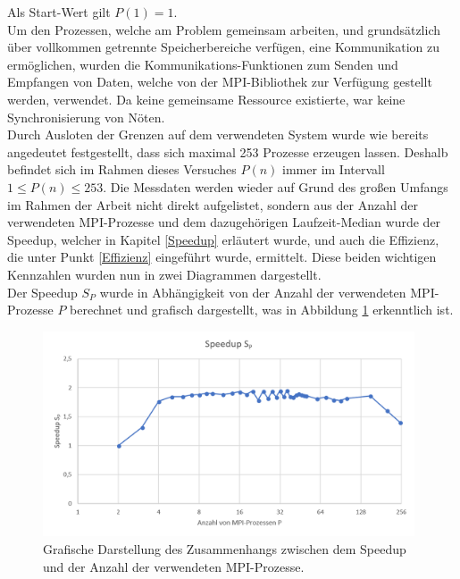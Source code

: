 \begin{description}
						Als Start-Wert gilt $P(1) = 1$.\\
						Um den Prozessen, welche am Problem gemeinsam arbeiten, und grundsätzlich über vollkommen getrennte Speicherbereiche verfügen, eine Kommunikation zu ermöglichen, wurden die Kommunikations-Funktionen zum Senden und Empfangen von Daten, welche von der MPI-Bibliothek zur Verfügung gestellt werden, verwendet. Da keine gemeinsame Ressource existierte, war keine Synchronisierung von Nöten.\\
						Durch Ausloten der Grenzen auf dem verwendeten System wurde wie bereits angedeutet festgestellt, dass sich maximal 253 Prozesse erzeugen lassen. Deshalb befindet sich im Rahmen dieses Versuches $P(n)$ immer im Intervall $1 \leq P(n) \leq 253$.
						Die Messdaten werden wieder auf Grund des großen Umfangs im Rahmen der Arbeit nicht direkt aufgelistet, sondern aus der Anzahl der verwendeten MPI-Prozesse und dem dazugehörigen Laufzeit-Median wurde der Speedup, welcher in Kapitel \ref{Speedup} erläutert wurde, und auch die Effizienz, die unter Punkt \ref{Effizienz} eingeführt wurde, ermittelt. Diese beiden wichtigen Kennzahlen wurden nun in zwei Diagrammen dargestellt.\\
						Der Speedup $S_P$ wurde in Abhängigkeit von der Anzahl der verwendeten MPI-Prozesse $P$ berechnet und grafisch dargestellt, was in Abbildung \ref{fig:Speedup_MPI} erkenntlich ist.
						
						\begin{figure}
							\centering	
							\includegraphics[width=11cm]{Abbildungen/Speedup_MPI.png}
							\caption{Grafische Darstellung des Zusammenhangs zwischen dem Speedup und der Anzahl der verwendeten MPI-Prozesse.}
							\label{fig:Speedup_MPI}
						\end{figure}
						

\end{description}
